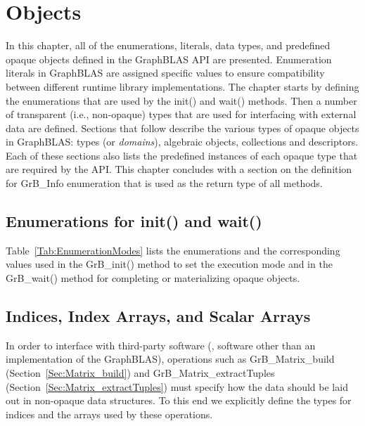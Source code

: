 \chapter{Objects}
\label{Chp:Objects}

In this chapter, all of the enumerations, literals, data types, and predefined 
opaque objects defined in the GraphBLAS API are presented.  Enumeration literals 
in GraphBLAS are assigned specific values to ensure compatibility between 
different runtime library implementations.  The chapter starts by defining the
enumerations that are used by the {\sf init()} and {\sf wait()} methods.  Then
a number of transparent (i.e., non-opaque) types that are used for interfacing 
with external data are defined.  Sections that follow describe the various
types of opaque objects in GraphBLAS: types (or \emph{domains}), algebraic 
objects, collections and descriptors.  Each of these sections also lists the 
predefined instances of each opaque type that are required by the API.  This chapter
concludes with a section on the definition for {\sf GrB\_Info} enumeration 
that is used as the return type of all methods.

\section{Enumerations for {\sf init()} and {\sf wait()}}

Table~\ref{Tab:EnumerationModes} lists the enumerations and the corresponding
values used in the {\sf GrB\_init()} method to set the execution mode and in
the {\sf GrB\_wait()} method for completing or materializing opaque objects.

\section{Indices, Index Arrays, and Scalar Arrays}

In order to interface with third-party software (\ie, software other than
an implementation of the GraphBLAS), operations 
such as {\sf GrB\_Matrix\_build} (Section~\ref{Sec:Matrix_build}) and
{\sf GrB\_Matrix\_extractTuples} (Section~\ref{Sec:Matrix_extractTuples}) must specify
how the data should be laid out in  non-opaque data structures.  To 
this end we explicitly define the types for indices and the arrays 
used by these operations.

